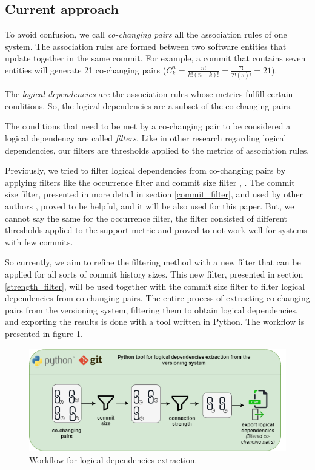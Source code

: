 \documentclass[runningheads]{comsis2}
\newcommand*{\Comb}[2]{{}C^{#1}_{#2}}%
\begin{document}
\subsection{Current approach}


To avoid confusion, we call \textit{co-changing pairs} all the association rules of one system. The association rules are formed between two software entities that update together in the same commit.
For example, a commit that contains seven entities will generate 21 co-changing pairs ($\Comb{n}{k}=\frac{n!}{k!(n-k)!} = \frac{7!}{2!(5)!} = 21$).


The \textit{logical dependencies} are the association rules whose metrics fulfill certain conditions. So, the logical dependencies are a subset of the co-changing pairs. 

The conditions that need to be met by a co-changing pair to be considered a logical dependency are called \textit{filters}. Like in other research regarding logical dependencies, our filters are thresholds applied to the metrics of association rules. 

Previously, we tried to filter logical dependencies from co-changing pairs by applying filters like the occurrence filter and commit size filter \cite{saci19}, \cite{enase19}. 
The commit size filter, presented in more detail in section \ref{commit_filter}, and used by other authors \cite{DBLP:journals/jss/AjienkaC17}, proved to be helpful, and it will be also used for this paper. 
But, we cannot say the same for the occurrence filter, the filter consisted of different thresholds applied to the support metric and proved to not work well for systems with few commits.

So currently, we aim to refine the filtering method with a new filter that can be applied for all sorts of commit history sizes. This new filter, presented in section \ref{strength_filter}, will be used together with the commit size filter to filter logical dependencies from co-changing pairs. The entire process of extracting co-changing pairs from the versioning system, filtering them to obtain logical dependencies, and exporting the results is done with a tool written in Python. The workflow is presented in figure \ref{fig:workflow_key}.

\begin{figure}
\centering
\includegraphics[width=\textwidth]{ld_workflow.png}
\caption{Workflow for logical dependencies extraction.}
\label{fig:workflow_key}
\centering
\end{figure}
\end{document}
